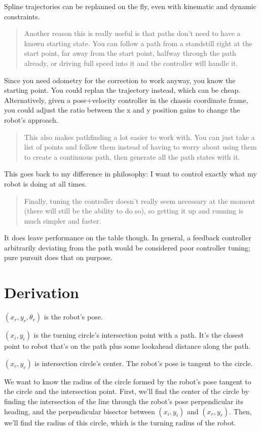 \documentclass[10pt,conference,compsoc]{IEEEtran}
\begin{document}
Spline trajectories can be replanned on the fly, even with kinematic and dynamic
constraints.
\begin{quote}
  Another reason this is really useful is that paths don’t need to have a known
  starting state. You can follow a path from a standstill right at the start
  point, far away from the start point, halfway through the path already, or
  driving full speed into it and the controller will handle it.
\end{quote}

Since you need odometry for the correction to work anyway, you know the starting
point. You could replan the trajectory instead, which can be cheap.
Alternatively, given a pose+velocity controller in the chassis coordinate frame,
you could adjust the ratio between the x and y position gains to change the
robot's approach.
\begin{quote}
  This also makes pathfinding a lot easier to work with. You can just take a
  list of points and follow them instead of having to worry about using them to
  create a continuous path, then generate all the path states with it.
\end{quote}

This goes back to my difference in philosophy: I want to control exactly what my
robot is doing at all times.
\begin{quote}
  Finally, tuning the controller doesn’t really seem necessary at the moment
  (there will still be the ability to do so), so getting it up and running is
  much simpler and faster.
\end{quote}

It does leave performance on the table though. In general, a feedback controller
arbitrarily deviating from the path would be considered poor controller tuning;
pure pursuit does that on purpose.

\section{Derivation}

$(x_r, y_r, \theta_r)$ is the robot's pose.

$(x_i, y_i)$ is the turning circle's intersection point with a path. It's the
closest point to robot that's on the path plus some lookahead distance along the
path.

$(x_c, y_c)$ is intersection circle's center. The robot's pose is tangent to the
circle.

We want to know the radius of the circle formed by the robot's pose tangent to
the circle and the intersection point. First, we'll find the center of the
circle by finding the intersection of the line through the robot's pose
perpendicular its heading, and the perpendicular bisector between $(x_i, y_i)$
and $(x_r, y_r)$. Then, we'll find the radius of this circle, which is the
turning radius of the robot.
\end{document}
